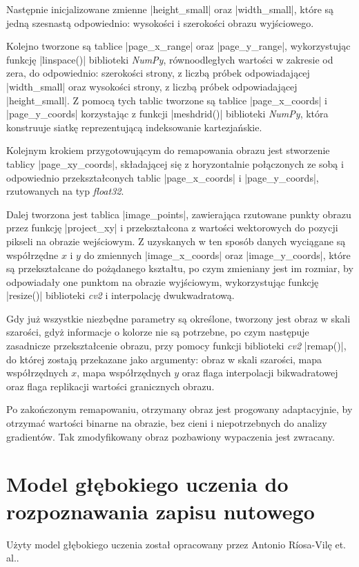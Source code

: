 Następnie inicjalizowane zmienne \pyth|height_small| oraz \pyth|width_small|, które są jedną szesnastą odpowiednio: wysokości i szerokości obrazu wyjściowego.

Kolejno tworzone są tablice \pyth|page_x_range| oraz \pyth|page_y_range|, wykorzystując funkcję \pyth|linspace()| biblioteki \textit{NumPy}, równoodległych wartości w zakresie od zera, do odpowiednio: szerokości strony, z liczbą próbek odpowiadającej \pyth|width_small| oraz wysokości strony, z liczbą próbek odpowiadającej \pyth|height_small|. Z pomocą tych tablic tworzone są tablice \pyth|page_x_coords| i \pyth|page_y_coords| korzystając z funkcji \pyth|meshdrid()| biblioteki \textit{NumPy}, która konstruuje siatkę reprezentującą indeksowanie kartezjańskie.

Kolejnym krokiem przygotowującym do remapowania obrazu jest stworzenie tablicy \pyth|page_xy_coords|, składającej się z horyzontalnie połączonych ze sobą i odpowiednio przekształconych tablic \pyth|page_x_coords| i \pyth|page_y_coords|, rzutowanych na typ \textit{float32}.

Dalej tworzona jest tablica \pyth|image_points|, zawierająca rzutowane punkty obrazu przez funkcję \pyth|project_xy| i przekształcona z wartości wektorowych do pozycji pikseli na obrazie wejściowym. Z uzyskanych w ten sposób danych wyciągane są współrzędne $x$ i $y$ do zmiennych \pyth|image_x_coords| oraz \pyth|image_y_coords|, które są przekształcane do pożądanego kształtu, po czym zmieniany jest im rozmiar, by odpowiadały one punktom na obrazie wyjściowym, wykorzystując funkcję \pyth|resize()| biblioteki \textit{cv2} i interpolację dwukwadratową.

Gdy już wszystkie niezbędne parametry są określone, tworzony jest obraz w skali szarości, gdyż informacje o kolorze nie są potrzebne, po czym następuje zasadnicze przekształcenie obrazu, przy pomocy funkcji biblioteki \textit{cv2} \pyth|remap()|, do której zostają przekazane jako argumenty: obraz w skali szarości, mapa współrzędnych $x$, mapa współrzędnych $y$ oraz flaga interpolacji bikwadratowej oraz flaga replikacji wartości granicznych obrazu.

Po zakończonym remapowaniu, otrzymany obraz jest progowany adaptacyjnie, by otrzymać wartości binarne na obrazie, bez cieni i niepotrzebnych do analizy gradientów. Tak zmodyfikowany obraz pozbawiony wypaczenia jest zwracany.






\section{Model głębokiego uczenia do rozpoznawania zapisu nutowego} \label{Model}
Użyty model głębokiego uczenia został opracowany przez Antonio Ríosa-Vilę et. al.\cite{Rios-Vila2023}. 

